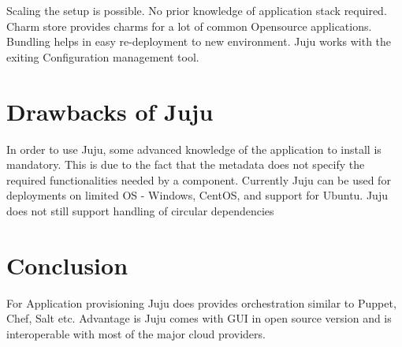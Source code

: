 \documentclass[9pt,twocolumn,twoside]{../../styles/osajnl}
\begin{document}
Scaling the setup is possible. No prior knowledge of application stack
required. Charm store provides charms for a lot of common Opensource
applications. Bundling helps in easy re-deployment to new environment.
Juju works with the exiting Configuration management tool.

\section{Drawbacks of Juju}

In order to use Juju, some advanced knowledge of the application to
install is mandatory. This is due to the fact that the metadata does
not specify the required functionalities needed by a component.
Currently Juju can be used for deployments on limited OS - Windows,
CentOS, and support for Ubuntu. Juju does not still support handling
of circular dependencies


\section{Conclusion}
For Application provisioning Juju does provides orchestration similar
to Puppet, Chef, Salt etc. Advantage is Juju comes with GUI in open
source version and is interoperable with most of the major cloud
providers.


 
\end{document}
